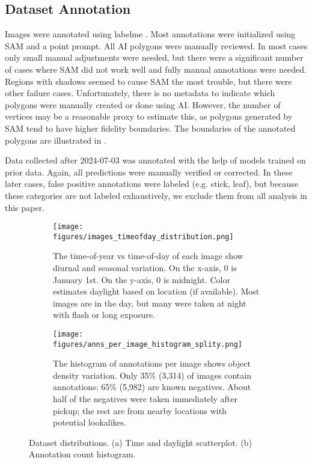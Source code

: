 \documentclass{article}
\begin{document}
\subsection{Dataset Annotation}

Images were annotated using labelme \cite{wada_labelmeailabelme_nodate}.
Most annotations were initialized using SAM and a point prompt.
All AI polygons were manually reviewed.
In most cases only small manual adjustments were needed, but there were a significant number of cases where
  SAM did not work well and fully manual annotations were needed.
Regions with shadows seemed to cause SAM the most trouble, but there were other failure cases.
Unfortunately, there is no metadata to indicate which polygons were manually created or done using AI.
However, the number of vertices may be a reasonable proxy to estimate this, as polygons generated by SAM
  tend to have higher fidelity boundaries.
The boundaries of the annotated polygons are illustrated in .

Data collected after 2024-07-03 was annotated with the help of models trained
on prior data. Again, all predictions were manually verified or corrected. In
these later cases, false positive annotations were labeled (e.g. stick, leaf),
but because these categories are not labeled exhaustively, we exclude them from
all analysis in this paper.


\begin{figure}[t]
\centering
\begin{subfigure}[t]{0.48\textwidth}
    \centering
    \texttt{[image: figures/images\_timeofday\_distribution.png]}
    \caption{
        The time-of-year vs time-of-day of each image show diurnal and seasonal
        variation.  On the x-axis, 0 is January 1st. On the y-axis, 0 is
        midnight.  Color estimates daylight based on location (if available).
        Most images are in the day, but many were taken at night with flash or
        long exposure.
    }
    \label{fig:TimeOfDayDistribution}
\end{subfigure}
\hfill
\begin{subfigure}[t]{0.48\textwidth}
    \centering
    \texttt{[image: figures/anns\_per\_image\_histogram\_splity.png]}
    \caption{
        The histogram of annotations per image shows object density variation.
        Only 35\% (3,314) of images contain annotations; 65\% (5,982) are known negatives.
        About half of the negatives were taken immediately after pickup; the
        rest are from nearby locations with potential lookalikes.
    }
    \label{fig:AnnotsPerImage}
\end{subfigure}
\caption{Dataset distributions. (a) Time and daylight scatterplot. (b) Annotation count histogram.}
\label{fig:TimeAndAnnots}
\end{figure}
\end{document}
